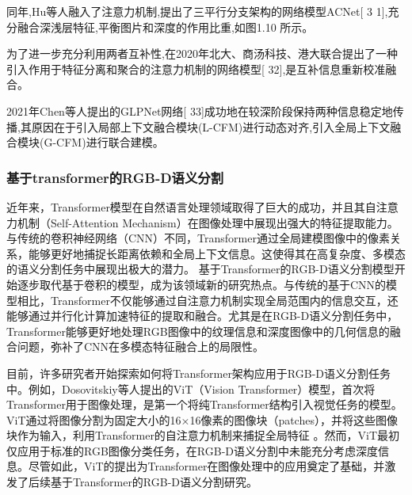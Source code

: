 同年,Hu等人融入了注意力机制,提出了三平行分支架构的网络模型ACNet[ 3 1],充分融合深浅层特征,平衡图片和深度的作用比重,如图1.10 所示。

为了进一步充分利用两者互补性,在2020年北大、商汤科技、港大联合提出了一种引入作用于特征分离和聚合的注意力机制的网络模型[ 32],是互补信息重新校准融合。

2021年Chen等人提出的GLPNet网络[ 33]成功地在较深阶段保持两种信息稳定地传播,其原因在于引入局部上下文融合模块(L-CFM)进行动态对齐,引入全局上下文融合模块(G-CFM)进行联合建模。
\fi








\subsubsection{基于transformer的RGB-D语义分割}
近年来，Transformer模型在自然语言处理领域取得了巨大的成功，并且其自注意力机制（Self-Attention Mechanism）在图像处理中展现出强大的特征提取能力。与传统的卷积神经网络（CNN）不同，Transformer通过全局建模图像中的像素关系，能够更好地捕捉长距离依赖和全局上下文信息。这使得其在高复杂度、多模态的语义分割任务中展现出极大的潜力。
基于Transformer的RGB-D语义分割模型开始逐步取代基于卷积的模型，成为该领域新的研究热点。与传统的基于CNN的模型相比，Transformer不仅能够通过自注意力机制实现全局范围内的信息交互，还能够通过并行化计算加速特征的提取和融合。尤其是在RGB-D语义分割任务中，Transformer能够更好地处理RGB图像中的纹理信息和深度图像中的几何信息的融合问题，弥补了CNN在多模态特征融合上的局限性。

目前，许多研究者开始探索如何将Transformer架构应用于RGB-D语义分割任务中。例如，Dosovitskiy等人提出的ViT（Vision Transformer）模型，首次将Transformer用于图像处理，是第一个将纯Transformer结构引入视觉任务的模型。ViT通过将图像分割为固定大小的16×16像素的图像块（patches），并将这些图像块作为输入，利用Transformer的自注意力机制来捕捉全局特征 。然而，ViT最初仅应用于标准的RGB图像分类任务，在RGB-D语义分割中未能充分考虑深度信息。尽管如此，ViT的提出为Transformer在图像处理中的应用奠定了基础，并激发了后续基于Transformer的RGB-D语义分割研究。


